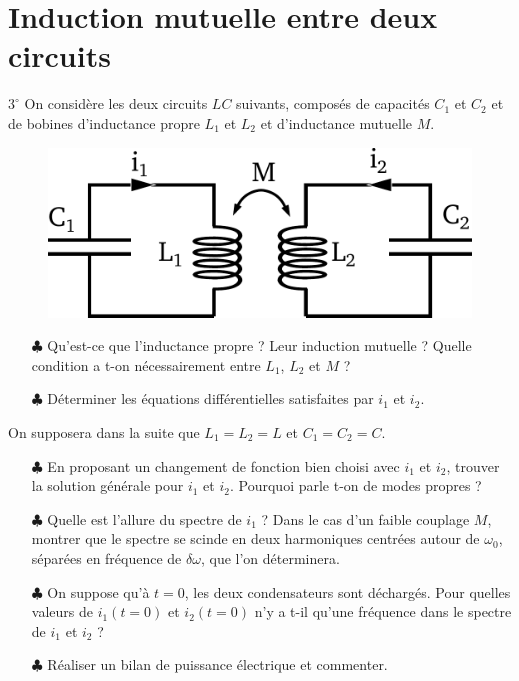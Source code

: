 \documentclass{report}
\begin{document}
\section*{Induction mutuelle entre deux circuits}
$3^\circ$
On considère les deux circuits $LC$ suivants, composés de capacités $C_1$ et $C_2$ et de bobines d'inductance propre $L_1$ et $L_2$ et d'inductance mutuelle $M$. 

\begin{figure}[h!]
\centering
		\includegraphics[scale=0.45]{induction_mutuelle.pdf}
\end{figure}

\begin{itemize}
	
	\item[$\clubsuit$] Qu'est-ce que l'inductance propre ? Leur induction mutuelle ? Quelle condition a t-on nécessairement entre $L_1$, $L_2$ et $M$ ?
	
	\item[$\clubsuit$] Déterminer les équations différentielles satisfaites par $i_1$ et $i_2$.
	
\end{itemize}

On supposera dans la suite que $L_1=L_2=L$ et $C_1=C_2=C$.

\begin{itemize}	
	
	\item[$\clubsuit$] En proposant un changement de fonction bien choisi avec $i_1$ et $i_2$, trouver la solution générale pour $i_1$ et $i_2$. Pourquoi parle t-on de modes propres ?
	
	\item[$\clubsuit$] Quelle est l'allure du spectre de $i_1$ ? Dans le cas d'un faible couplage $M$, montrer que le spectre se scinde en deux harmoniques centrées autour de $\omega_0$, séparées en fréquence de $\delta\omega$, que l'on déterminera.  
	
	\item[$\clubsuit$] On suppose qu'à $t=0$, les deux condensateurs sont déchargés. Pour quelles valeurs de $i_1(t=0)$ et $i_2(t=0)$ n'y a t-il qu'une fréquence dans le spectre de $i_1$ et $i_2$ ?
	
	\item[$\clubsuit$] Réaliser un bilan de puissance électrique et commenter. 
	
\end{itemize}
\end{document}
